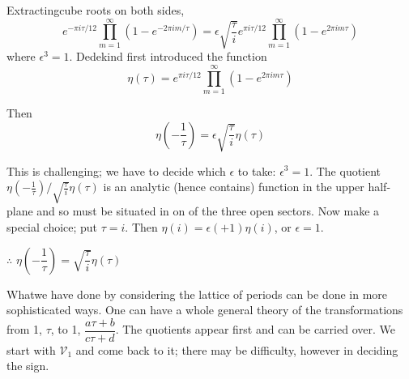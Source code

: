 Extracting\pageoriginale cube roots on both sides,
$$
e^{-\pi i \tau/12} \prod^\infty_{m=1} (1- e^{-2 \pi i m/\tau}) = \epsilon
\sqrt{\frac{\tau}{i}} e^{\pi i \tau/12} \prod^\infty_{m=1} (1- e^{2
  \pi i m \tau}) 
$$
where $\epsilon^3 =1$. Dedekind first introduced the function 
$$
\eta (\tau) = e^{\pi i \tau /12} \prod^\infty_{m=1} (1- e^{2 \pi i m \tau})
$$

Then 
$$
\eta\left(- \frac{1}{\tau}\right) = \epsilon\sqrt{\frac{\tau}{i}} \eta (\tau)
$$

This is challenging; we have to decide which $\epsilon$ to take:
$\epsilon^3=1$. The quotient $\eta(-\frac{1}{\tau})\Big/
\sqrt{\frac{\tau}{i}} \eta (\tau)$ is an analytic (hence contains)
function in the upper half-plane and so must be situated in on of the
three open sectors. Now make a special choice; put $\tau=i$. Then
$\eta(i)= \epsilon(+1) \eta (i)$, or $\epsilon=1$.

\medskip
$\therefore$ \hspace{2cm} $\eta \left(- \dfrac{1}{\tau}\right)=
\sqrt{\dfrac{\tau}{i}} \eta (\tau)$
\medskip

What\pageoriginale we have done by considering the lattice of periods can be done in
more sophisticated ways. One can have a whole general theory of the
transformations from 1, $\tau$, to 1, $\dfrac{a \tau+b}{c
  \tau+d}$. The quotients appear first and can be carried over. We
start with $\mathscr{V}_1$ and come back to it; there may be
difficulty, however in deciding the sign. 
